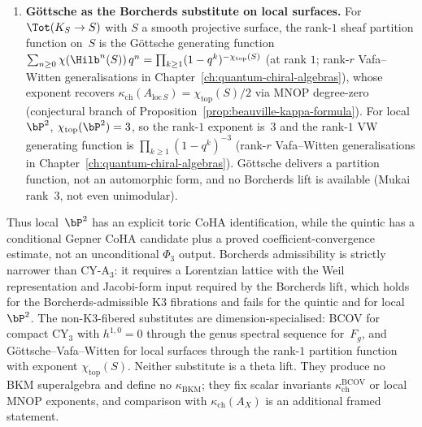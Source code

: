 \begin{remark}
\begin{enumerate}[label=\textup{(\alph*)}]
 \item \textbf{G\"ottsche as the Borcherds substitute on local surfaces.} For $\Tot(K_S \to S)$ with $S$ a smooth projective surface, the rank-$1$ sheaf partition function on~$S$ is the G\"ottsche generating function $\sum_{n\geq 0} \chi(\Hilb^n(S))\, q^n = \prod_{k\geq 1} (1 - q^k)^{-\chi_{\mathrm{top}}(S)}$ (at rank $1$; rank-$r$ Vafa--Witten generalisations in Chapter~\ref{ch:quantum-chiral-algebras}), whose exponent recovers $\kappa_{\mathrm{ch}}(A_{\mathrm{loc}\,S}) = \chi_{\mathrm{top}}(S)/2$ via MNOP degree-zero (conjectural branch of Proposition~\ref{prop:beauville-kappa-formula}). For local~$\bP^2$, $\chi_{\mathrm{top}}(\bP^2) = 3$, so the rank-$1$ exponent is~$3$ and the rank-$1$ VW generating function is $\prod_{k\geq 1}(1-q^k)^{-3}$ (rank-$r$ Vafa--Witten generalisations in Chapter~\ref{ch:quantum-chiral-algebras}). G\"ottsche delivers a partition function, not an automorphic form, and no Borcherds lift is available (Mukai rank~$3$, not even unimodular).
\end{enumerate}
Thus local~$\bP^2$ has an explicit toric CoHA identification, while the quintic has a conditional Gepner CoHA candidate plus a proved coefficient-convergence estimate, not an unconditional $\Phi_3$ output. Borcherds admissibility is strictly narrower than CY-A$_3$: it requires a Lorentzian lattice with the Weil representation and Jacobi-form input required by the Borcherds lift, which holds for the Borcherds-admissible K3 fibrations and fails for the quintic and for local~$\bP^2$. The non-K3-fibered substitutes are dimension-specialised: BCOV for compact CY$_3$ with $h^{1,0}=0$ through the genus spectral sequence for~$F_g$, and G\"ottsche--Vafa--Witten for local surfaces through the rank-$1$ partition function with exponent $\chi_{\mathrm{top}}(S)$. Neither substitute is a theta lift. They produce no BKM superalgebra and define no $\kappa_{\mathrm{BKM}}$; they fix scalar invariants \(\kappa_{\mathrm{ch}}^{\mathrm{BCOV}}\) or local MNOP exponents, and comparison with $\kappa_{\mathrm{ch}}(A_X)$ is an additional framed statement.
\end{remark}


